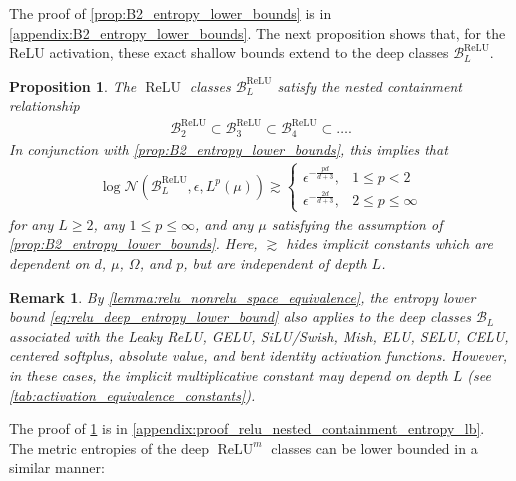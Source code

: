 \documentclass{article}
\DeclareMathOperator{\ReLU}{\mathrm{ReLU}}
\def\cB{{\mathcal{B}}}
\def\cN{{\mathcal{N}}}
\newtheorem{proposition}[theorem]{Proposition}
\newtheorem{remark}[theorem]{Remark}
\begin{document}
    The proof of \cref{prop:B2_entropy_lower_bounds} is in \cref{appendix:B2_entropy_lower_bounds}. The next proposition shows that, for the ReLU activation, these exact shallow bounds extend to the deep classes $\cB_L^{\ReLU}$.
    \begin{proposition} \label{prop:relu_nested_containment_entropy_lb}
        The $\ReLU$ classes $\cB_L^{\ReLU}$ satisfy the nested containment relationship
        \begin{align} \label{eq:relu_nested_containment}
            \cB_2^{\ReLU} \subset \cB_3^{\ReLU} \subset \cB_4^{\ReLU} \subset \dots .
        \end{align}
        In conjunction with \cref{prop:B2_entropy_lower_bounds}, this implies that
        \begin{align} \label{eq:relu_deep_entropy_lower_bound}
            \log \cN(\cB_L^{\ReLU}, \epsilon, L^p(\mu)) \gtrsim \begin{cases}
                \epsilon^{-\frac{pd}{d+3}}, &1 \leq p < 2 \\
                \epsilon^{-\frac{2d}{d+3}}, &2 \leq p \leq \infty
            \end{cases}
        \end{align}
        for any $L \geq 2$, any $1 \leq p \leq \infty$, and any $\mu$ satisfying the assumption of \cref{prop:B2_entropy_lower_bounds}. Here, $\gtrsim$ hides implicit constants which are dependent on $d$, $\mu$, $\Omega$, and $p$, but are independent of depth $L$.
    \end{proposition}
    \begin{remark}
        By \cref{lemma:relu_nonrelu_space_equivalence}, the entropy lower bound \eqref{eq:relu_deep_entropy_lower_bound} also applies to the deep classes $\cB_L$ associated with the Leaky ReLU, GELU, SiLU/Swish, Mish, ELU, SELU, CELU, centered softplus, absolute value, and bent identity activation functions. However, in these cases, the implicit multiplicative constant may depend on depth $L$ (see \cref{tab:activation_equivalence_constants}).
    \end{remark}
    The proof of \cref{prop:relu_nested_containment_entropy_lb} is in \cref{appendix:proof_relu_nested_containment_entropy_lb}. The metric entropies of the deep $\ReLU^m$ classes can be lower bounded in a similar manner:
\end{document}
